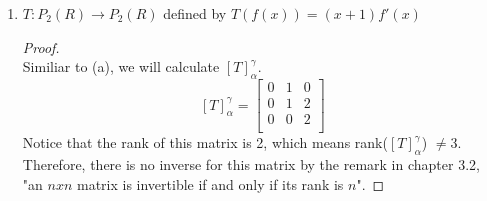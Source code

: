 \documentclass[11pt]{scrartcl}
\begin{document}
\begin{enumerate}[label=\alph*.]
{\begin{proof}
\begin{align*}
\begin{array}{ccc|ccc}
	0 & 1 & -4 & 0 & -1 & 0 \\ 
	0 & 0 & 1 & 0 & 0 & -1 \\ 
	\end{array}\right]\\
	r_1 \leftarrow 10r_3 + r_1, \quad r_2 \leftarrow 4r_3 + r_2\\
	(I_3|[T^-1]_{\alpha}^{\gamma})=
	\left[\begin{array}{ccc|ccc}
	1 & 0 & 0 & -1 & -2 & -10 \\ 
	0 & 1 & 0 & 0 & -1 & -4 \\ 
	0 & 0 & 1 & 0 & 0 & -1 \\ 
	\end{array}\right]\\
	\end{align*}	
	Therefore, the inverse of $T$ exists and is \\$T^{-1}(a_0 + a_1x + a_2x^2) 
	=-a_0 -2a_2 -10a_2 + (-a_1 - 4a_2)x -a_2x^2$
	\end{proof}
	}

	\item{
	$T : P_2(R) \rightarrow P_2(R)$ defined by $T(f(x)) = (x + 1)f'(x)$
	\begin{proof}
	\-\\
	Similiar to (a), we will calculate $[T]_{\alpha}^{\gamma}$.
	\[
	[T]_{\alpha}^{\gamma} = 
	\begin{bmatrix}
		0 & 1 & 0\\
		0 & 1 & 2\\ 
		0 & 0 & 2\\
	\end{bmatrix}
	\]
	Notice that the rank of this matrix is 2, which means rank($[T]_{\alpha}^{\gamma}$) $\neq 3$.
	Therefore, there is no inverse for this matrix by the remark in chapter 3.2,
	"an $nxn$ matrix is invertible if and only if its rank is $n$".
	\end{proof}
	}


\end{enumerate}
\end{document}
